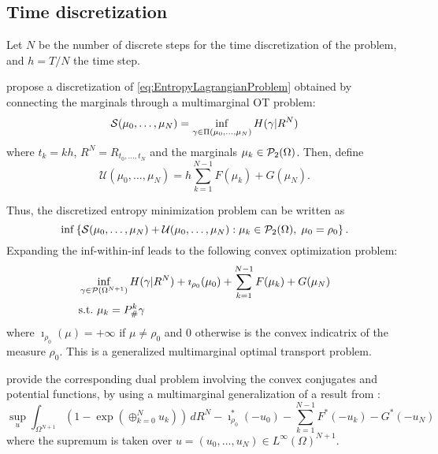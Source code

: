 \documentclass[../report.tex]{subfiles}
\begin{document}
\subsection{Time discretization}

Let $N$ be the number of discrete steps for the time discretization of the problem, and $h=T/N$ the time step.

\textcite{benamou2018entropy} propose a discretization of \eqref{eq:EntropyLagrangianProblem} obtained by connecting the marginals through a multimarginal OT problem:
\begin{equation}
\mathcal{S}(\mu_0,\ldots,\mu_N) =
\inf_{\gamma \in \Pi(\mu_0, \ldots, \mu_N)}
H(\gamma|R^N)
\end{equation}
where $t_k = kh$, $R^N = R_{t_0,\ldots,t_N}$ and the marginals $\mu_k \in \mathcal{P}_2(\Omega)$.
Then, define
\begin{equation}
\mathcal{U}(\mu_0,\ldots,\mu_N) = h\sum_{k=1}^{N-1} F(\mu_k) + G(\mu_N).
\end{equation}

Thus, the discretized entropy minimization problem can be written as
\[
\inf\left\{
\mathcal{S}(\mu_0, \ldots, \mu_N) +
\mathcal{U}(\mu_0, \ldots, \mu_N)
: \mu_k \in \mathcal{P}_2(\Omega),\; \mu_0 = \rho_0
\right\}.
\]
Expanding the inf-within-inf leads to the following convex optimization problem:
\begin{equation}
\begin{aligned}
&\inf_{\gamma \in \mathcal{P}(\Omega^{N+1})}
H(\gamma | R^N) + \imath_{\rho_0}(\mu_0) + \sum_{k=1}^{N-1} F(\mu_k) + G(\mu_N) \\
&\mathrm{s.t.}\ \mu_k = P^k_\#\gamma
\end{aligned}
\end{equation}
where $\imath_{\rho_0}(\mu) = +\infty$ if $\mu\neq \rho_0$ and $0$ otherwise is the convex indicatrix of the measure $\rho_0$. This is a generalized multimarginal optimal transport problem.

\textcite{benamou2018entropy} provide the corresponding dual problem involving the convex conjugates and potential functions, by using a multimarginal generalization of a result from \textcite{chizat2016scaling}:
\begin{equation}\label{eq:TimeDiscreteDual}
\sup_u
\int_{\Omega^{N+1}} \left(1-\exp\left(\oplus_{k=0}^N u_k\right)\right) \,dR^N
-\imath_{\rho_0}^*(-u_0) - \sum_{k=1}^{N-1} F^*(-u_k) - G^*(-u_N)
\end{equation}
where the supremum is taken over $u = (u_0,\ldots,u_N) \in L^\infty(\Omega)^{N+1}$.
\end{document}
